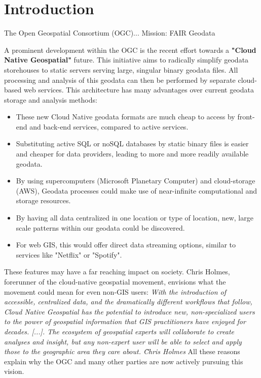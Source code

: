 \chapter{Introduction}

The Open Geospatial Consortium (OGC)...
Mission: FAIR Geodata 

A prominent development within the OGC is the recent effort towards a \textbf{"Cloud Native Geospatial"} future. 
This initiative aims to radically simplify geodata storehouses to static servers serving large, singular binary geodata files. All processing and analysis of this geodata can then be performed by separate cloud-based web services. 
This architecture has many advantages over current geodata storage and analysis methods:
\begin{itemize}
  \item These new Cloud Native geodata formats are much cheap to access by front-end and back-end services, compared to active services.
  \item Substituting active SQL or noSQL databases by static binary files is easier and cheaper for data providers, leading to more and more readily available geodata.
  \item By using supercomputers (Microsoft Planetary Computer) and cloud-storage (AWS), Geodata processes could make use of near-infinite computational and storage resources. 
  \item By having all data centralized in one location or type of location, new, large scale patterns within our geodata could be discovered.  
  \item For web GIS, this would offer direct data streaming options, similar to services like "Netflix" or "Spotify".  
\end{itemize}

These features may have a far reaching impact on society. Chris Holmes, forerunner of the cloud-native geospatial movement, envisions what the movement could mean for even non-GIS users: 
\emph{
  With the introduction of accessible, centralized data, and the dramatically different workflows that follow, Cloud Native Geospatial has the potential to introduce new, non-specialized users to the power of geospatial information that GIS practitioners have enjoyed for decades. [...]. The ecosystem of geospatial experts will collaborate to create analyses and insight, but any non-expert user will be able to select and apply those to the geographic area they care about. \~ Chris Holmes
}
All these reasons explain why the OGC and many other parties are now actively pursuing this vision.

